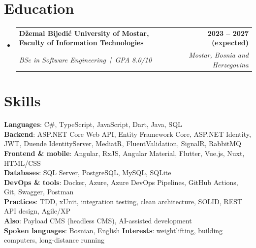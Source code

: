 \documentclass[a4paper,10.5pt]{article}
\makeatletter
\newcommand{\cvheading}[4]{
  \vspace{-1pt}\item
  \begin{tabular*}{\linewidth}[t]{l@{\extracolsep{\fill}}r}
    \textbf{#1} & \textbf{#2} \\
    \textit{\small#3} & \textit{\small #4} \\
  \end{tabular*}\vspace{-6pt}
}
\newcommand{\liststart}{\begin{itemize}[leftmargin=0.15in, label={}]}
\newcommand{\listend}{\end{itemize}}
\makeatother
\begin{document}
\section{Education}
\liststart
  \cvheading{Džemal Bijedić University of Mostar, Faculty of Information Technologies}{2023 -- 2027 (expected)}
            {BSc in Software Engineering \,|\, GPA 8.0/10}{Mostar, Bosnia and Herzegovina}
\listend

\section{Skills}
\begin{itemize}[leftmargin=0.15in, label={}]
  \small{\item{
    \textbf{Languages}{: C\#, TypeScript, JavaScript, Dart, Java, SQL} \\
    \textbf{Backend}{: ASP.NET Core Web API, Entity Framework Core, ASP.NET Identity, JWT, Duende IdentityServer, MediatR, FluentValidation, SignalR, RabbitMQ} \\
    \textbf{Frontend \& mobile}{: Angular, RxJS, Angular Material, Flutter, Vue.js, Nuxt, HTML/CSS} \\
    \textbf{Databases}{: SQL Server, PostgreSQL, MySQL, SQLite} \\
    \textbf{DevOps \& tools}{: Docker, Azure, Azure DevOps Pipelines, GitHub Actions, Git, Swagger, Postman} \\
    \textbf{Practices}{: TDD, xUnit, integration testing, clean architecture, SOLID, REST API design, Agile/XP} \\
    \textbf{Also}{: Payload CMS (headless CMS), AI-assisted development} \\
    \textbf{Spoken languages}{: Bosnian, English} \quad
    \textbf{Interests}{: weightlifting, building computers, long-distance running}
  }}
\end{itemize}
\end{document}

